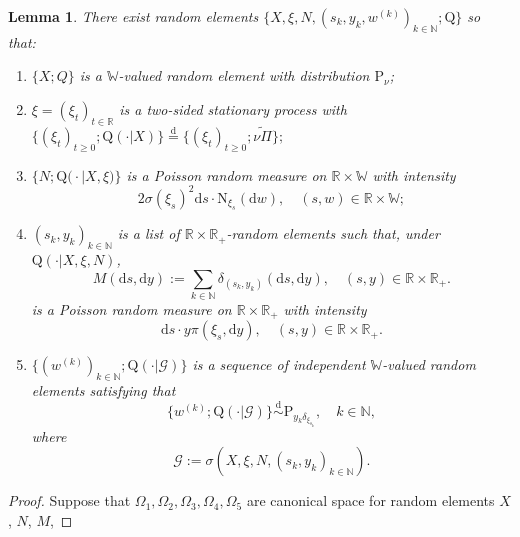 \documentclass[12pt,a4paper]{amsart}
\numberwithin{equation}{section}
\theoremstyle{plain}
\newtheorem{lem}[thm]{Lemma}
\theoremstyle{definition}
\theoremstyle{remark}
\begin{document}
\begin{lem}  \label{thm:E.16}
	There exist random elements
  	$\big\{X, \xi, N, (s_k, y_k,w^{(k)})_{k\in \mathbb N}; \mathrm Q\big\}$
	so that:
\begin{enumerate}
\item
	$\{X;Q\}$ is a $\mathbb W$-valued random element with distribution $\mathrm P_\nu$;
\item
		$\xi = (\xi_t)_{t\in \mathbb R}$
	 is a two-sided stationary process with 
	 $\{(\xi_t)_{t \geq 0}; \mathrm Q(\cdot | X)\} \overset{\text{d}} = \{(\xi_t)_{t \geq 0}; \widetilde{\nu\Pi}\};$
\item
	$\big\{N; \mathrm Q\big(\cdot \big|X,\xi\big)\big\}$ is a Poisson random measure on $\mathbb R\times \mathbb W$ with intensity
\[
	2 \sigma(\xi_s)^2 {\mathrm d}s \cdot \mathrm N_{\xi_s}({\mathrm d}w),
	\quad (s,w)\in \mathbb R\times \mathbb W;
\]
\item
	$(s_k, y_k)_{k\in \mathbb N}$ is a list of $\mathbb R \times \mathbb R_+$-random elements %
	such that, under $\mathrm Q(\cdot | X, \xi, N)$, 
\[
	M(\mathrm ds,\mathrm dy)
	:= \sum_{k\in \mathbb N} \delta_{(s_k, y_k)}(\mathrm ds,\mathrm dy), \quad (s,y)\in \mathbb R \times \mathbb R_+.
\]	
is a Poisson random measure on $\mathbb R \times \mathbb R_+$ with intensity
\[
	\mathrm ds \cdot y \pi(\xi_s, \mathrm dy), \quad (s,y)\in \mathbb R \times \mathbb R_+.
\]
\item
	$\{(w^{(k)})_{k\in \mathbb N}; \mathrm Q(\cdot|\mathscr G)\}$ is a sequence of independent $\mathbb W$-valued random elements satisfying that
\[
	\{w^{(k)}; \mathrm Q(\cdot| \mathscr G)\}
	\overset{\text{d}}\sim \mathrm P_{y_k\delta_{\xi_{s_k}}},
	\quad k\in \mathbb N,
\]
	where
\[
	\mathscr G
	:= \sigma(X, \xi, N, (s_k, y_k)_{k\in \mathbb N}).
\]
\end{enumerate}
\end{lem}
\begin{proof}
	Suppose that $\Omega_1,\Omega_2,\Omega_3,\Omega_4,\Omega_5$ are canonical space for random elements $X$, $N$, $M$, 
\end{proof}
\end{document}
